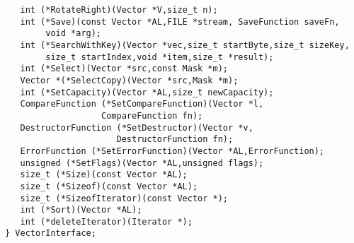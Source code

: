 \begin{verbatim}
   int (*RotateRight)(Vector *V,size_t n);
   int (*Save)(const Vector *AL,FILE *stream, SaveFunction saveFn,
        void *arg);
   int (*SearchWithKey)(Vector *vec,size_t startByte,size_t sizeKey,
        size_t startIndex,void *item,size_t *result);
   int (*Select)(Vector *src,const Mask *m);
   Vector *(*SelectCopy)(Vector *src,Mask *m);
   int (*SetCapacity)(Vector *AL,size_t newCapacity);
   CompareFunction (*SetCompareFunction)(Vector *l,
                   CompareFunction fn);
   DestructorFunction (*SetDestructor)(Vector *v,
                      DestructorFunction fn);
   ErrorFunction (*SetErrorFunction)(Vector *AL,ErrorFunction);
   unsigned (*SetFlags)(Vector *AL,unsigned flags);
   size_t (*Size)(const Vector *AL);
   size_t (*Sizeof)(const Vector *AL);
   size_t (*SizeofIterator)(const Vector *);
   int (*Sort)(Vector *AL);
   int (*deleteIterator)(Iterator *);
} VectorInterface;
\end{verbatim}
